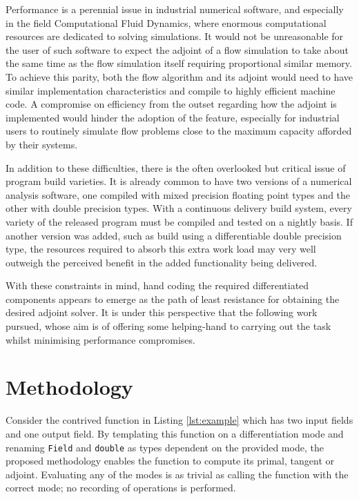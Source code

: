 \documentclass[a4paper,10pt]{article}
\begin{document}
Performance is a perennial issue in industrial numerical software, and especially in the field Computational Fluid Dynamics, where enormous computational resources are dedicated to solving simulations. It would not be unreasonable for the user of such software to expect the adjoint of a flow simulation to take about the same time as the flow simulation itself requiring proportional similar memory. To achieve this parity, both the flow algorithm and its adjoint would need to have similar implementation characteristics and compile to highly efficient machine code. A compromise on efficiency from the outset regarding how the adjoint is implemented would hinder the adoption of the feature, especially for industrial users to routinely simulate flow problems close to the maximum capacity afforded by their systems.

In addition to these difficulties, there is the often overlooked but critical issue of program build varieties. It is already common to have two versions of a numerical analysis software, one compiled with mixed precision floating point types and the other with double precision types. With a continuous delivery build system, every variety of the released program must be compiled and tested on a nightly basis. If another version was added, such as build using a differentiable double precision type, the resources required to absorb this extra work load may very well outweigh the perceived benefit in the added functionality being delivered.

With these constraints in mind, hand coding the required differentiated components appears to emerge as the path of least resistance for obtaining the desired adjoint solver. It is under this perspective that the following work pursued, whose aim is of offering some helping-hand to carrying out the task whilst minimising performance compromises.

\section{Methodology}
Consider the contrived function in Listing \ref{lst:example} which has two input fields and one output field. By templating this function on a differentiation mode and renaming \texttt{Field} and \texttt{double} as types dependent on the provided mode, the proposed methodology enables the function to compute its primal, tangent or adjoint. Evaluating any of the modes is as trivial as calling the function with the correct mode; no recording of operations is performed.
\end{document}
